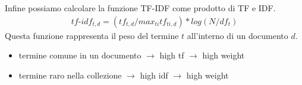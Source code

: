 Infine possiamo calcolare la funzione TF-IDF come prodotto di TF e IDF.
\begin{align*}
  tf\text{-}idf_{t, d} = (tf_{t,d} / max_{ti} tf_{ti,d}) * log(N/df_t)
\end{align*}
Questa funzione rappresenta il peso del termine $t$ all'interno di un documento $d$.

\begin{itemize}
  \item termine comune in un documento $\rightarrow$ high tf $\rightarrow$ high weight
  \item termine raro nella collezione $\rightarrow$ high idf $\rightarrow$ high weight
\end{itemize}
